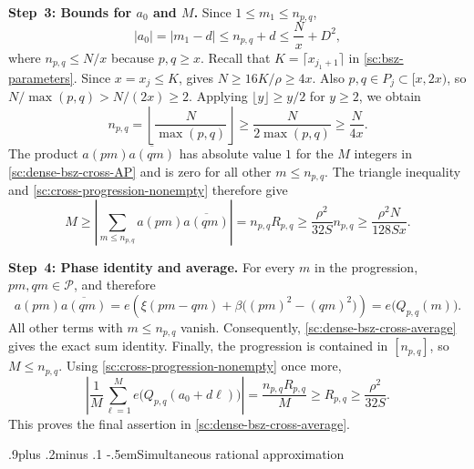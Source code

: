 \documentclass[twoside]{aomart}
\makeatletter
\theoremstyle{paperplain}
\theoremstyle{paperdefinition}
\renewcommand\subsection{\@startsection{subsection}{2}{\z@}
  {.9\baselineskip plus .2\baselineskip minus .1\baselineskip}
  {-.5em}{\normalfont\bfseries}}
\renewenvironment{proof}[1][\proofname]{\par\pushQED{\qed}%
  \normalfont\topsep6\p@\@plus3\p@\relax\trivlist
  \item[\hskip\labelsep\itshape #1\@addpunct{.}]\ignorespaces
}{\popQED\endtrivlist\@endpefalse}
\numberwithin{equation}{section}
\makeatother
\begin{document}
\begin{proof}
\par
\medskip
\noindent\textbf{Step~3: Bounds for $a_0$ and $M$.}
Since $1\le m_1\le n_{p,q}$,
\begin{equation*}
 |a_0|=|m_1-d|\le n_{p,q}+d
 \le \frac Nx+D^2,
 \end{equation*}
where $n_{p,q}\le N/x$ because $p,q\ge x$.
Recall that $K=\lceil x_{j_1+1}\rceil$ in
\eqref{sc:bsz-parameters}. Since $x=x_j\le K$,
 gives $N\ge16K/\rho\ge4x$.
Also $p,q\in P_j\subset[x,2x)$, so
$N/\max(p,q)>N/(2x)\ge2$.
Applying $\lfloor y\rfloor\ge y/2$ for $y\ge2$, we obtain
\begin{equation*}
 n_{p,q}=\left\lfloor\frac N{\max(p,q)}\right\rfloor
 \ge\frac N{2\max(p,q)}\ge\frac N{4x}.
 \end{equation*}
The product $a(pm)\overline{a(qm)}$ has absolute value $1$
for the $M$ integers in \eqref{sc:dense-bsz-cross-AP} and is
zero for all other $m\le n_{p,q}$. The triangle inequality and
\eqref{sc:cross-progression-nonempty} therefore give
\begin{equation*}
 M\ge\left|\sum_{m\le n_{p,q}}a(pm)\overline{a(qm)}\right|
 =n_{p,q}R_{p,q}
 \ge\frac{\rho^2}{32S}n_{p,q}
 \ge\frac{\rho^2N}{128Sx}.
 \end{equation*}

\par
\medskip
\noindent\textbf{Step~4: Phase identity and average.}
For every $m$ in the progression, $pm,qm\in\mathcal P$, and therefore
\begin{equation*}
 a(pm)\overline{a(qm)}=e\left(\xi(pm-qm)+\beta\bigl((pm)^2-(qm)^2\bigr)\right)
 =e\bigl(Q_{p,q}(m)\bigr).
 \end{equation*}
All other terms with $m\le n_{p,q}$ vanish. Consequently,
\eqref{sc:dense-bsz-cross-average} gives the exact sum identity.
Finally, the progression is contained in $[n_{p,q}]$, so $M\le n_{p,q}$.
Using \eqref{sc:cross-progression-nonempty} once more,
\begin{equation*}
 \left|\frac1M\sum_{\ell=1}^{M}
 e\bigl(Q_{p,q}(a_0+d\ell)\bigr)\right|
 =\frac{n_{p,q}R_{p,q}}{M}
 \ge R_{p,q}
 \ge\frac{\rho^2}{32S}.
 \end{equation*}
This proves the final assertion in \eqref{sc:dense-bsz-cross-average}.
\end{proof}

\subsection{Simultaneous rational approximation}
\end{document}
